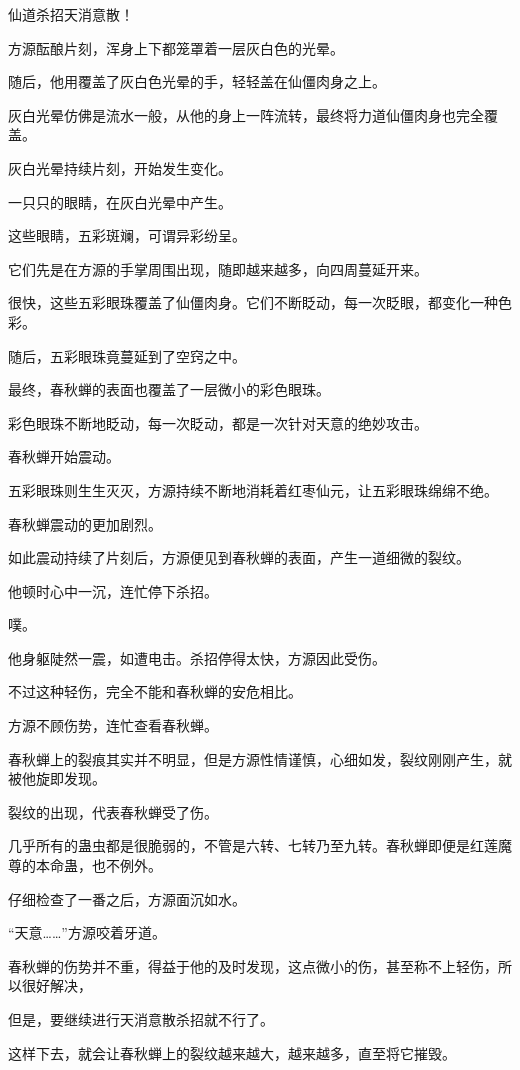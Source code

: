 \begin{this_body}
仙道杀招天消意散！

方源酝酿片刻，浑身上下都笼罩着一层灰白色的光晕。

随后，他用覆盖了灰白色光晕的手，轻轻盖在仙僵肉身之上。

灰白光晕仿佛是流水一般，从他的身上一阵流转，最终将力道仙僵肉身也完全覆盖。

灰白光晕持续片刻，开始发生变化。

一只只的眼睛，在灰白光晕中产生。

这些眼睛，五彩斑斓，可谓异彩纷呈。

它们先是在方源的手掌周围出现，随即越来越多，向四周蔓延开来。

很快，这些五彩眼珠覆盖了仙僵肉身。它们不断眨动，每一次眨眼，都变化一种色彩。

随后，五彩眼珠竟蔓延到了空窍之中。

最终，春秋蝉的表面也覆盖了一层微小的彩色眼珠。

彩色眼珠不断地眨动，每一次眨动，都是一次针对天意的绝妙攻击。

春秋蝉开始震动。

五彩眼珠则生生灭灭，方源持续不断地消耗着红枣仙元，让五彩眼珠绵绵不绝。

春秋蝉震动的更加剧烈。

如此震动持续了片刻后，方源便见到春秋蝉的表面，产生一道细微的裂纹。

他顿时心中一沉，连忙停下杀招。

噗。

他身躯陡然一震，如遭电击。杀招停得太快，方源因此受伤。

不过这种轻伤，完全不能和春秋蝉的安危相比。

方源不顾伤势，连忙查看春秋蝉。

春秋蝉上的裂痕其实并不明显，但是方源性情谨慎，心细如发，裂纹刚刚产生，就被他旋即发现。

裂纹的出现，代表春秋蝉受了伤。

几乎所有的蛊虫都是很脆弱的，不管是六转、七转乃至九转。春秋蝉即便是红莲魔尊的本命蛊，也不例外。

仔细检查了一番之后，方源面沉如水。

“天意……”方源咬着牙道。

春秋蝉的伤势并不重，得益于他的及时发现，这点微小的伤，甚至称不上轻伤，所以很好解决，

但是，要继续进行天消意散杀招就不行了。

这样下去，就会让春秋蝉上的裂纹越来越大，越来越多，直至将它摧毁。


\end{this_body}
